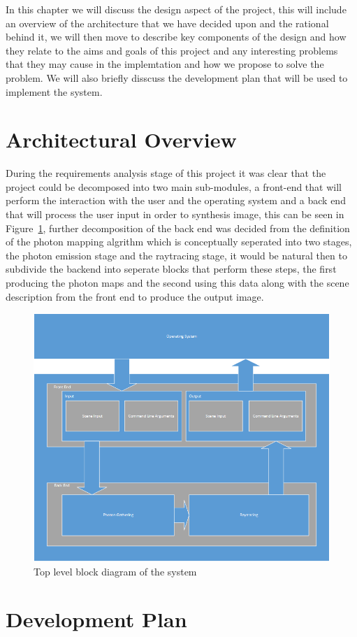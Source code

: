 \label{chap:design}
In this chapter we will discuss the design aspect of the project, this will include an overview of the
architecture that we have decided upon and the rational behind it, we will then move to describe key components of
the design and how they relate to the aims and goals of this project and any interesting problems that they
may cause in the implemtation and how we propose to solve the problem. We will also briefly disscuss the
development plan that will be used to implement the system.

\section{Architectural Overview}
During the requirements analysis stage of this project it was clear that the project could be decomposed into
two main sub-modules, a front-end that will perform the interaction with the user and the operating system and a
back end that will process the user input in order to synthesis image, this can be seen in 
Figure~\ref{fig:design_blocks}, further decomposition of the back end was decided from the definition of the
photon mapping algrithm which is conceptually seperated into two stages, the photon emission stage and the raytracing stage, it
would be natural then to subdivide the backend into seperate blocks that perform these steps, the first producing the photon
maps and the second using this data along with the scene description from the front end to produce the output image.

\begin{figure}
\centering
\includegraphics[scale=0.75]{./design/TopLevel.png}
\caption{Top level block diagram of the system}
\label{fig:design_blocks}
\end{figure}

\newpage

\newpage


\section{Development Plan}
